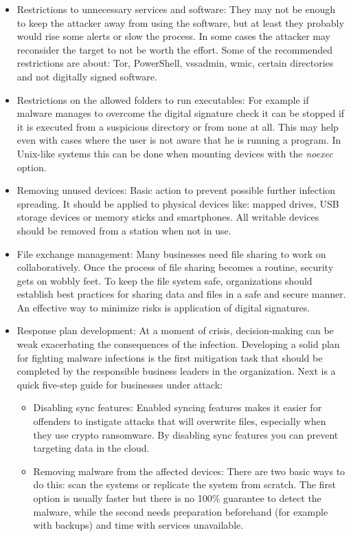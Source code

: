 \begin{itemize}
	\item Restrictions to unnecessary services and software:
They may not be enough to keep the attacker away from using the software, but at least they probably would rise some alerts or slow the process.
In some cases the attacker may reconsider the target to not be worth the effort.
Some of the recommended restrictions are about: Tor, PowerShell, vssadmin, wmic, certain directories and not digitally signed software.
	\item Restrictions on the allowed folders to run executables:
For example if malware manages to overcome the digital signature check it can be stopped if it is executed from a suspicious directory or from none at all.
This may help even with cases where the user is not aware that he is running a program.
In Unix-like systems this can be done when mounting devices with the \textit{noexec} option.
	\item Removing unused devices:
Basic action to prevent possible further infection spreading.
It should be applied to physical devices like: mapped drives, USB storage devices or memory sticks and smartphones.
All writable devices should be removed from a station when not in use.
	\item File exchange management:
Many businesses need file sharing to work on collaboratively.
Once the process of file sharing becomes a routine, security gets on wobbly feet.
To keep the file system safe, organizations should establish best practices for sharing data and files in a safe and secure manner.
An effective way to minimize risks is application of digital signatures.
	\item Response plan development:
At a moment of crisis, decision-making can be weak exacerbating the consequences of the infection.
Developing a solid plan for fighting malware infections is the first mitigation task that should be completed by the responsible business leaders in the organization.
\linej
Next is a quick five-step guide for businesses under attack:
	\begin{itemize}
		\item Disabling sync features:
Enabled syncing features makes it easier for offenders to instigate attacks that will overwrite files, especially when they use crypto ransomware.
By disabling sync features you can prevent targeting data in the cloud.
		\item Removing malware from the affected devices:
There are two basic ways to do this: scan the systems or replicate the system from scratch.
The first option is usually faster but there is no 100\% guarantee to detect the malware, while the second needs preparation beforehand (for example with backups) and time with services unavailable.

\end{itemize}
\end{itemize}
